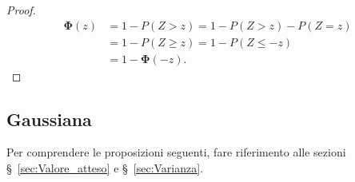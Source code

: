             \begin{proof}
                \hfill
                \begin{align*}
                    \mathbf{\Phi}(z) &= 1 - P(Z > z) = 1 - P(Z > z) - P(Z = z) \\
                                     &= 1 - P(Z \geq z) = 1 - P(Z \leq -z) \\
                                     &= 1 - \mathbf{\Phi}(-z)
                .\end{align*}
            \end{proof}
        \subsection{Gaussiana}
            \begin{note}
                Per comprendere le proposizioni seguenti, fare riferimento alle sezioni §~\ref{sec:Valore_atteso} e §~\ref{sec:Varianza}.
            \end{note}
